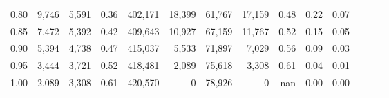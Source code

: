 \begin{tabular}{rrrrrrrrrrrrrr}
0.80 &   9,746 &  5,591 &  0.36 &  402,171 &   18,399 &  61,767 &  17,159 &  0.48 &  0.22 &      0.07 \\
0.85 &   7,472 &  5,392 &  0.42 &  409,643 &   10,927 &  67,159 &  11,767 &  0.52 &  0.15 &      0.05 \\
0.90 &   5,394 &  4,738 &  0.47 &  415,037 &    5,533 &  71,897 &   7,029 &  0.56 &  0.09 &      0.03 \\
0.95 &   3,444 &  3,721 &  0.52 &  418,481 &    2,089 &  75,618 &   3,308 &  0.61 &  0.04 &      0.01 \\
1.00 &   2,089 &  3,308 &  0.61 &  420,570 &        0 &  78,926 &       0 &   nan &  0.00 &      0.00 \\
\bottomrule
\end{tabular}
